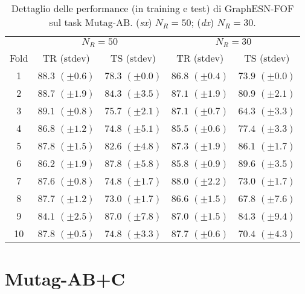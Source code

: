 \begin{table}[tbph]
\footnotesize
\caption[Dettaglio performance: GraphESN-FOF su Mutag-AB]{Dettaglio delle performance (in training e test) di GraphESN-FOF sul task Mutag-AB. (\emph{sx}) $N_R=50$; (\emph{dx}) $N_R=30$.}
\label{app:esp:Mutag-AB-FOF}
\centering
\begin{tabular}{c*{4}{c}}
\toprule
& \multicolumn{2}{c}{$N_R=50$} & \multicolumn{2}{c}{$N_R=30$}\\
Fold & TR (stdev) & TS (stdev) & TR (stdev) & TS (stdev)\\
\midrule
1 & $88.3$ $(\pm 0.6)$ & $78.3$ $(\pm 0.0)$ & $86.8$ $(\pm 0.4)$ & $73.9$ $(\pm 0.0)$\\
2 & $88.7$ $(\pm 1.9)$ & $84.3$ $(\pm 3.5)$ & $87.1$ $(\pm 1.9)$ & $80.9$ $(\pm 2.1)$\\
3 & $89.1$ $(\pm 0.8)$ & $75.7$ $(\pm 2.1)$ & $87.1$ $(\pm 0.7)$ & $64.3$ $(\pm 3.3)$\\
4 & $86.8$ $(\pm 1.2)$ & $74.8$ $(\pm 5.1)$ & $85.5$ $(\pm 0.6)$ & $77.4$ $(\pm 3.3)$\\
5 & $87.8$ $(\pm 1.5)$ & $82.6$ $(\pm 4.8)$ & $87.3$ $(\pm 1.9)$ & $86.1$ $(\pm 1.7)$\\
6 & $86.2$ $(\pm 1.9)$ & $87.8$ $(\pm 5.8)$ & $85.8$ $(\pm 0.9)$ & $89.6$ $(\pm 3.5)$\\
7 & $87.6$ $(\pm 0.8)$ & $74.8$ $(\pm 1.7)$ & $88.0$ $(\pm 2.2)$ & $73.0$ $(\pm 1.7)$\\
8 & $87.7$ $(\pm 1.2)$ & $73.0$ $(\pm 1.7)$ & $86.6$ $(\pm 1.5)$ & $67.8$ $(\pm 7.6)$\\
9 & $84.1$ $(\pm 2.5)$ & $87.0$ $(\pm 7.8)$ & $87.0$ $(\pm 1.5)$ & $84.3$ $(\pm 9.4)$\\
10 & $87.8$ $(\pm 0.5)$ & $74.8$ $(\pm 3.3)$ & $87.7$ $(\pm 0.6)$ & $70.4$ $(\pm 4.3)$\\
\bottomrule
\end{tabular}
\end{table}




\section{Mutag-AB+C}


